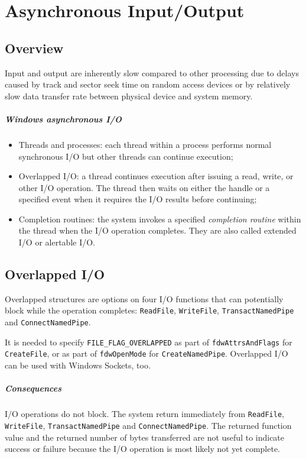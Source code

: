 \chapter{Asynchronous Input/Output}
\section{Overview}
Input and output are inherently slow compared to other processing due to delays caused by track and sector seek time on random access devices or by relatively slow data transfer rate between physical device and system memory.

\paragraph{Windows asynchronous I/O}
\begin{itemize}
\item Threads and processes: each thread within a process performs normal synchronous I/O but other threads can continue execution;
\item Overlapped I/O: a thread continues execution after issuing a read, write, or other I/O operation. The thread then waits on either the handle or a specified event when it requires the I/O results before continuing;
\item Completion routines: the system invokes a specified \emph{completion routine} within the thread when the I/O operation completes. They are also called extended I/O or alertable I/O.
\end{itemize}

\section{Overlapped I/O}
Overlapped structures are options on four I/O functions that can potentially block while the operation completes: \texttt{ReadFile}, \texttt{WriteFile}, \texttt{TransactNamedPipe} and \texttt{ConnectNamedPipe}.

It is needed to specify \texttt{FILE\_FLAG\_OVERLAPPED} as part of \texttt{fdwAttrsAndFlags} for \texttt{CreateFile}, or as part of \texttt{fdwOpenMode} for \texttt{CreateNamedPipe}. Overlapped I/O can be used with Windows Sockets, too.

\paragraph{Consequences}
I/O operations do not block. The system return immediately from \texttt{ReadFile}, \texttt{WriteFile}, \texttt{TransactNamedPipe} and \texttt{ConnectNamedPipe}. The returned function value and the returned number of bytes transferred are not useful to indicate success or failure because the I/O operation is most likely not yet complete.

